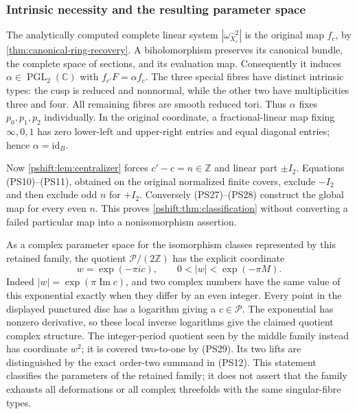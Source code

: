 \subsubsection{Intrinsic necessity and the resulting parameter space}

The analytically computed complete linear system
$|\omega_{X_c}^{-2}|$ is the original map $f_c$, by
\cref{thm:canonical-ring-recovery}. A biholomorphism preserves its
canonical bundle, the complete space of sections, and its evaluation
map. Consequently it induces $\alpha\in\operatorname{PGL}_2(\mathbb C)$
with $f_{c'}F=\alpha f_c$. The three special fibres have distinct
intrinsic types: the cusp is reduced and nonnormal, while the other
two have multiplicities three and four. All remaining fibres are
smooth reduced tori. Thus $\alpha$ fixes $p_0,p_1,p_2$ individually.
In the original coordinate, a fractional-linear map fixing
$\infty,0,1$ has zero lower-left and upper-right entries and equal
diagonal entries; hence $\alpha=\mathrm{id}_B$.

Now \cref{pshift:lem:centralizer} forces $c'-c=n\in\mathbb Z$
and linear part $\pm I_2$. Equations (PS10)--(PS11), obtained on
the original normalized finite covers, exclude $-I_2$ and then
exclude odd $n$ for $+I_2$. Conversely (PS27)--(PS28) construct
the global map for every even $n$. This proves
\cref{pshift:thm:classification} without converting a failed
particular map into a nonisomorphism assertion.

As a complex parameter space for the isomorphism classes represented
by this retained family, the quotient $\mathcal P/(2\mathbb Z)$ has
the explicit coordinate
\[
 w=\exp(-\pi ic),\qquad 0<|w|<\exp(-\pi M).
 \tag{PS29}\label{pshift:eq:parameter-disc}
\]
Indeed $|w|=\exp(\pi\operatorname{Im}c)$, and two complex numbers
have the same value of this exponential exactly when they differ
by an even integer. Every point in the displayed punctured disc
has a logarithm giving a $c\in\mathcal P$. The exponential has
nonzero derivative, so these local inverse logarithms give the
claimed quotient complex structure. The integer-period quotient
seen by the middle family instead has coordinate $w^2$; it is
covered two-to-one by (PS29). Its two lifts are distinguished by
the exact order-two summand in (PS12). This statement classifies
the parameters of the retained family; it does not assert that
the family exhausts all deformations or all complex threefolds
with the same singular-fibre types.
